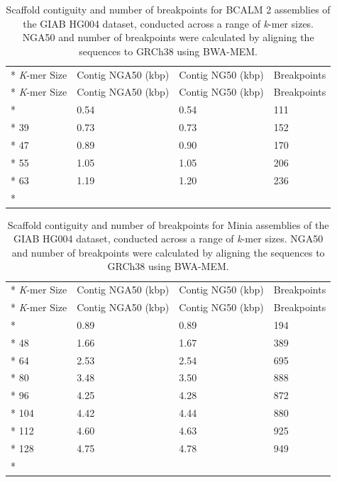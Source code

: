 \documentclass[
  12pt,
  oneside,
  openany]{book}
\begin{document}
\begin{appendices}
\hypertarget{tbl:kbcalm}{}
\begin{singlespace}
\small
\begin{longtable}[]{@{}llll@{}}
\caption[Scaffold contiguity and number of breakpoints for BCALM 2 assemblies of the GIAB HG004 dataset, conducted across a range of \emph{k}-mer sizes.]{\label{tbl:kbcalm}Scaffold contiguity and number of breakpoints for BCALM 2 assemblies of the GIAB HG004 dataset, conducted across a range of \emph{k}-mer sizes. NGA50 and number of breakpoints were calculated by aligning the sequences to GRCh38 using BWA-MEM.}\tabularnewline*
\toprule
\emph{K}-mer Size & Contig NGA50 (kbp) & Contig NG50 (kbp) & Breakpoints\tabularnewline*
\midrule
\endfirsthead
\toprule
\emph{K}-mer Size & Contig NGA50 (kbp) & Contig NG50 (kbp) & Breakpoints\tabularnewline*
\midrule
\endhead
31 & 0.54 & 0.54 & 111\tabularnewline*
39 & 0.73 & 0.73 & 152\tabularnewline*
47 & 0.89 & 0.90 & 170\tabularnewline*
55 & 1.05 & 1.05 & 206\tabularnewline*
63 & 1.19 & 1.20 & 236\tabularnewline*
\bottomrule
\end{longtable}
\end{singlespace}

\hypertarget{tbl:kminia}{}
\begin{singlespace}
\small
\begin{longtable}[]{@{}llll@{}}
\caption[Scaffold contiguity and number of breakpoints for Minia assemblies of the GIAB HG004 dataset, conducted across a range of \emph{k}-mer sizes.]{\label{tbl:kminia}Scaffold contiguity and number of breakpoints for Minia assemblies of the GIAB HG004 dataset, conducted across a range of \emph{k}-mer sizes. NGA50 and number of breakpoints were calculated by aligning the sequences to GRCh38 using BWA-MEM.}\tabularnewline*
\toprule
\emph{K}-mer Size & Contig NGA50 (kbp) & Contig NG50 (kbp) & Breakpoints\tabularnewline*
\midrule
\endfirsthead
\toprule
\emph{K}-mer Size & Contig NGA50 (kbp) & Contig NG50 (kbp) & Breakpoints\tabularnewline*
\midrule
\endhead
32 & 0.89 & 0.89 & 194\tabularnewline*
48 & 1.66 & 1.67 & 389\tabularnewline*
64 & 2.53 & 2.54 & 695\tabularnewline*
80 & 3.48 & 3.50 & 888\tabularnewline*
96 & 4.25 & 4.28 & 872\tabularnewline*
104 & 4.42 & 4.44 & 880\tabularnewline*
112 & 4.60 & 4.63 & 925\tabularnewline*
128 & 4.75 & 4.78 & 949\tabularnewline*
\bottomrule
\end{longtable}
\end{singlespace}


\end{appendices}
\end{document}

